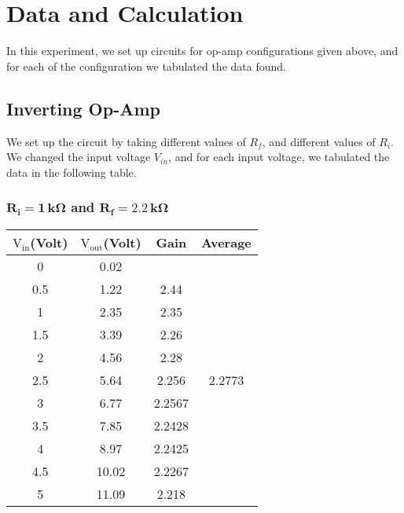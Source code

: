 \documentclass[12pt]{article}
\begin{document}
\section{Data and Calculation}
In this experiment, we set up circuits for op-amp configurations given above, and for each of the configuration we tabulated the data found.
\subsection{Inverting Op-Amp}
We set up the circuit by taking different values of $ R_f $, and different values of $ R_i $.
 We changed the input voltage $ V_{in} $, and for each input voltage, we tabulated the data in the following table.
\subsubsection{$\mathbf{R_i = 1\, k \Omega}$ and $\mathbf{R_f = 2.2\, k \Omega}$}
\begin{table}[H]
	\centering
	\begin{tabular}{|c|c|c|c|}
		\hline
		$\mathrm{V_{in}}$(Volt) & $\mathrm{V_{out}}$(Volt) & Gain             & Average                            \\ \hline \hline
		0            & 0.02          &                  & \multirow{11}{*}{2.2773} \\ \cline{1-3}
		0.5          & 1.22          & 2.44             &                                    \\ \cline{1-3}
		1            & 2.35          & 2.35             &                                    \\ \cline{1-3}
		1.5          & 3.39          & 2.26             &                                    \\ \cline{1-3}
		2            & 4.56          & 2.28             &                                    \\ \cline{1-3}
		2.5          & 5.64          & 2.256            &                                    \\ \cline{1-3}
		3            & 6.77          & 2.2567 &                                    \\ \cline{1-3}
		3.5          & 7.85          & 2.2428 &                                    \\ \cline{1-3}
		4            & 8.97          & 2.2425           &                                    \\ \cline{1-3}
		4.5          & 10.02         & 2.2267 &                                    \\ \cline{1-3}
		5            & 11.09         & 2.218            &                                    \\ \hline
	\end{tabular}
\end{table}
\end{document}
